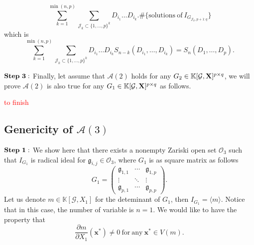 \documentclass[11pt]{article}
\numberwithin{Property}{section}
\numberwithin{Theorem}{section}
\numberwithin{Proposition}{section}
\numberwithin{Lemma}{section}
\numberwithin{Corollary}{section}
\numberwithin{Definition}{section}
\numberwithin{Remark}{section}
\numberwithin{Conjecture}{section}
\numberwithin{Problem}{section}
\numberwithin{Claim}{section}
\theoremstyle{definition}
\numberwithin{Example}{section}
\newcommand{\field}{\mathbb{K}} %
\newcommand{\mat}[1]{\mathbf{\MakeUppercase{#1}}} %
\newcommand{\todo}[1]{\textcolor{red}{#1}} %
\begin{document}
\[\sum_{k=1}^{\min(n,p)} \sum_{\mathcal{J}_k \subset\{1, \ldots, p\}^k}D_{i_1} \ldots D_{i_k} . \# \{\mathrm{solutions \ of \ } I_{G_{\mathcal{J}_k, p+1:q}}\}\] which is 
\[
\sum_{k=1}^{\min(n,p)} \sum_{\mathcal{J}_k \subset\{1, \ldots, p\}^k}D_{i_1} \ldots D_{i_k}S_{n-k}(D_{i_1}, \ldots, D_{i_k}) = S_n(D_1, \ldots, D_p). 
\]

$\bf{Step \ 3:}$ Finally, let assume that $\mathcal{A}(2)$ holds for any $G_2 \in \field[\mathcal{G}, \mat{X}]^{p \times q}$, we will prove $\mathcal{A}(2)$ is also true for any $G_1 \in \field[\mathcal{G}, \mat{X}]^{p \times q}$ as follows.

\todo{to finish}
\subsection{Genericity of $\mathcal{A}(3)$} 
$\bf{Step \ 1:}$ We show here that there exists a nonempty Zariski open set $\mathcal{O}_3$ such that $I_{G_1}$ is radical ideal for $\mathfrak{g}_{i,j} \in \mathcal{O}_3$, where $G_1$ is as square matrix as follows 
\[
G_1 = \left( \begin{matrix}
\mathfrak{g}_{1,1}  & \cdots  & \mathfrak{g}_{1, p}\\
\vdots & \ddots & \vdots \\
\mathfrak{g}_{p,1} & \cdots  & \mathfrak{g}_{p, p}
\end{matrix} \right).
\] Let us denote $m \in \field[\mathcal{G}, X_1]$ for the deteminant of $G_1$, then $I_{G_1} = \langle m \rangle$. Notice that in this case, the number of variable is $n = 1$. We would like to have the property that \[\frac{\partial m}{\partial X_1}(\mathbf{x}^*) \ne 0 \ \mathrm{for \ any} \ \mathbf{x}^* \in V(m). \] 
\end{document}
